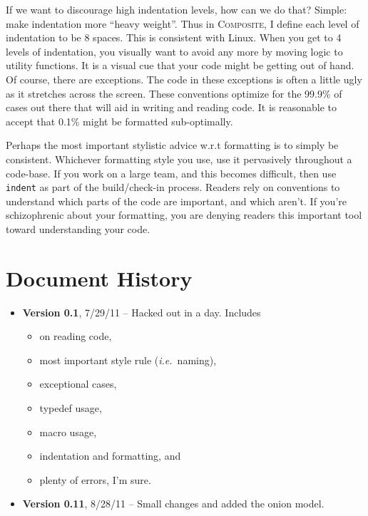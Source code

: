 \documentclass[11pt,onecolumn]{article}
\def\composite{\textsc{Composite}}
\def\ie{\textit{i.e.}}
\newcommand{\head}[1]{\vspace{0.4em}\noindent{\bf #1}}
\newcommand{\lsthead}[1]{{\bf #1}}
\begin{document}
If we want to discourage high indentation levels, how can we do that?
Simple: make indentation more ``heavy weight''.  Thus in \composite ,
I define each level of indentation to be 8 spaces.  This is consistent
with Linux.  When you get to 4 levels of indentation, you visually
want to avoid any more by moving logic to utility functions.  It is a
visual cue that your code might be getting out of hand.  Of course,
there are exceptions.  The code in these exceptions is often a little
ugly as it stretches across the screen.  These conventions optimize
for the 99.9\% of cases out there that will aid in writing and reading
code.  It is reasonable to accept that 0.1\% might be formatted
sub-optimally.

\head{Consistency.}  Perhaps the most important stylistic advice w.r.t
formatting is to simply be consistent.  Whichever formatting style you
use, use it pervasively throughout a code-base.  If you work on a
large team, and this becomes difficult, then use {\tt indent} as part
of the build/check-in process.  Readers rely on conventions to
understand which parts of the code are important, and which aren't.
If you're schizophrenic about your formatting, you are denying readers
this important tool toward understanding your code.






\section{Document History}
\label{s:hist}

\begin{itemize}
\item \lsthead{Version 0.1}, 7/29/11 -- Hacked out in a day.  Includes
\begin{itemize}[itemsep=0pt,topsep=1pt,parsep=1pt,leftmargin=2.5em]
\item on reading code,
\item most important style rule (\ie\ naming),
\item exceptional cases,
\item typedef usage,
\item macro usage,
\item indentation and formatting, and
\item plenty of errors, I'm sure.
\end{itemize}
\item \lsthead{Version 0.11}, 8/28/11 -- Small changes and added the
  onion model.
\end{itemize}
\end{document}

